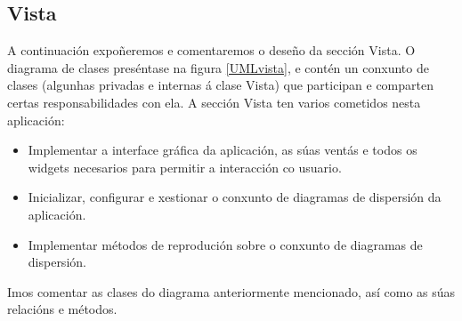 
\subsection{Vista}

A continuación expoñeremos e comentaremos o deseño da sección Vista. O diagrama de clases preséntase na figura \ref{UMLvista}, e contén un conxunto de clases (algunhas privadas e internas á clase Vista) que participan e comparten certas responsabilidades con ela. A sección Vista ten varios cometidos nesta aplicación:

\begin{itemize}
\item Implementar a interface gráfica da aplicación, as súas ventás e todos os widgets necesarios para permitir a interacción co usuario.
\item Inicializar, configurar e xestionar o conxunto de diagramas de dispersión da aplicación. 
\item Implementar métodos de reprodución sobre o conxunto de diagramas de dispersión.
\end{itemize}

Imos comentar as clases do diagrama anteriormente mencionado, así como as súas relacións e métodos.

